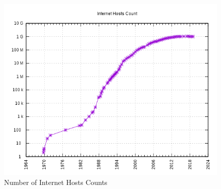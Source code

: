 \documentclass{resources/WeSTassignment}
\begin{document}
\begin{figure}[h]
    \centering
    \includegraphics[scale=0.5]{resources/Internet_Hosts_Count_log.png}
    \caption{Number of Internet Hosts Counts}  
    \label{fig:log_plot}
\end{figure}
\end{document}
